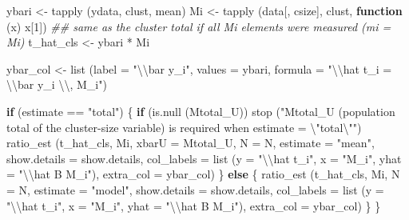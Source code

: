 \documentclass[
  letterpaper,
  DIV=11,
  numbers=noendperiod]{scrreprt}
\newenvironment{Shaded}{\begin{snugshade}}{\end{snugshade}}
\newcommand{\AttributeTok}[1]{\textcolor[rgb]{0.40,0.45,0.13}{#1}}
\newcommand{\ControlFlowTok}[1]{\textcolor[rgb]{0.00,0.23,0.31}{\textbf{#1}}}
\newcommand{\DecValTok}[1]{\textcolor[rgb]{0.68,0.00,0.00}{#1}}
\newcommand{\DocumentationTok}[1]{\textcolor[rgb]{0.37,0.37,0.37}{\textit{#1}}}
\newcommand{\FunctionTok}[1]{\textcolor[rgb]{0.28,0.35,0.67}{#1}}
\newcommand{\NormalTok}[1]{\textcolor[rgb]{0.00,0.23,0.31}{#1}}
\newcommand{\OtherTok}[1]{\textcolor[rgb]{0.00,0.23,0.31}{#1}}
\newcommand{\SpecialCharTok}[1]{\textcolor[rgb]{0.37,0.37,0.37}{#1}}
\newcommand{\StringTok}[1]{\textcolor[rgb]{0.13,0.47,0.30}{#1}}
\renewcommand{\[}{\begin{equation}}
\renewcommand{\]}{\end{equation}}
\begin{document}
\begin{Shaded}
\begin{Highlighting}[]
\NormalTok{  ybari }\OtherTok{\textless{}{-}} \FunctionTok{tapply}\NormalTok{ (ydata, clust, mean)}
\NormalTok{  Mi    }\OtherTok{\textless{}{-}} \FunctionTok{tapply}\NormalTok{ (data[, csize], clust, }\ControlFlowTok{function}\NormalTok{ (x) x[}\DecValTok{1}\NormalTok{])}
  \DocumentationTok{\#\# same as the cluster total if all Mi elements were measured (mi = Mi)}
\NormalTok{  t\_hat\_cls }\OtherTok{\textless{}{-}}\NormalTok{ ybari }\SpecialCharTok{*}\NormalTok{ Mi}

\NormalTok{  ybar\_col }\OtherTok{\textless{}{-}} \FunctionTok{list}\NormalTok{ (}\AttributeTok{label =} \StringTok{"}\SpecialCharTok{\textbackslash{}\textbackslash{}}\StringTok{bar y\_i"}\NormalTok{, }\AttributeTok{values =}\NormalTok{ ybari, }\AttributeTok{formula =} \StringTok{"}\SpecialCharTok{\textbackslash{}\textbackslash{}}\StringTok{hat t\_i = }\SpecialCharTok{\textbackslash{}\textbackslash{}}\StringTok{bar y\_i }\SpecialCharTok{\textbackslash{}\textbackslash{}}\StringTok{, M\_i"}\NormalTok{)}

  \ControlFlowTok{if}\NormalTok{ (estimate }\SpecialCharTok{==} \StringTok{"total"}\NormalTok{)}
\NormalTok{  \{}
      \ControlFlowTok{if}\NormalTok{ (}\FunctionTok{is.null}\NormalTok{ (Mtotal\_U))}
          \FunctionTok{stop}\NormalTok{ (}\StringTok{"Mtotal\_U (population total of the cluster{-}size variable) is required when estimate = }\SpecialCharTok{\textbackslash{}"}\StringTok{total}\SpecialCharTok{\textbackslash{}"}\StringTok{"}\NormalTok{)}
      \FunctionTok{ratio\_est}\NormalTok{ (t\_hat\_cls, Mi, }\AttributeTok{xbarU =}\NormalTok{ Mtotal\_U, }\AttributeTok{N =}\NormalTok{ N, }\AttributeTok{estimate =} \StringTok{"mean"}\NormalTok{, }\AttributeTok{show.details =}\NormalTok{ show.details,}
                 \AttributeTok{col\_labels =} \FunctionTok{list}\NormalTok{ (}\AttributeTok{y =} \StringTok{"}\SpecialCharTok{\textbackslash{}\textbackslash{}}\StringTok{hat t\_i"}\NormalTok{, }\AttributeTok{x =} \StringTok{"M\_i"}\NormalTok{, }\AttributeTok{yhat =} \StringTok{"}\SpecialCharTok{\textbackslash{}\textbackslash{}}\StringTok{hat B M\_i"}\NormalTok{),}
                 \AttributeTok{extra\_col =}\NormalTok{ ybar\_col)}
\NormalTok{  \}}
  \ControlFlowTok{else}
\NormalTok{  \{}
      \FunctionTok{ratio\_est}\NormalTok{ (t\_hat\_cls, Mi, }\AttributeTok{N =}\NormalTok{ N, }\AttributeTok{estimate =} \StringTok{"model"}\NormalTok{, }\AttributeTok{show.details =}\NormalTok{ show.details,}
                 \AttributeTok{col\_labels =} \FunctionTok{list}\NormalTok{ (}\AttributeTok{y =} \StringTok{"}\SpecialCharTok{\textbackslash{}\textbackslash{}}\StringTok{hat t\_i"}\NormalTok{, }\AttributeTok{x =} \StringTok{"M\_i"}\NormalTok{, }\AttributeTok{yhat =} \StringTok{"}\SpecialCharTok{\textbackslash{}\textbackslash{}}\StringTok{hat B M\_i"}\NormalTok{),}
                 \AttributeTok{extra\_col =}\NormalTok{ ybar\_col)}
\NormalTok{  \}}
\NormalTok{\}}


\end{Highlighting}
\end{Shaded}
\end{document}

